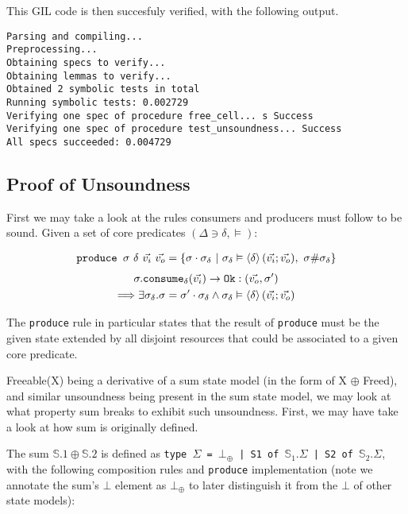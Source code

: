 \documentclass[,a4paper,oneside]{article}
\newcommand{\code}[1]{\texttt{#1}}
\newcommand{\mmdl}{\ensuremath{\mathbb S}}
\newcommand{\rarr}{\ensuremath{\rightarrow}}
\begin{document}
This GIL code is then succesfuly verified, with the following output.

\begin{verbatim}
Parsing and compiling...
Preprocessing...
Obtaining specs to verify...
Obtaining lemmas to verify...
Obtained 2 symbolic tests in total
Running symbolic tests: 0.002729
Verifying one spec of procedure free_cell... s Success
Verifying one spec of procedure test_unsoundness... Success
All specs succeeded: 0.004729	
\end{verbatim}


\subsection{Proof of Unsoundness}

First we may take a look at the rules consumers and producers must follow to be sound. Given a set of core predicates $(\Delta\ni\delta, \vDash)$:

\newcommand{\ins}[0]{\vec{v_i}}
\newcommand{\outs}[0]{\vec{v_o}}

\begin{gather*}
	\code{produce }\sigma ~\delta ~\ins~\outs = \{\sigma \cdot \sigma_\delta ~|~\sigma_\delta \vDash \corepred{$\delta$}{\ins}{\outs}, ~\sigma\#\sigma_\delta\}
\end{gather*}
\begin{gather*}
	\sigma.\code{consume}_\delta(\ins)\rarr \code{Ok}:(\outs,\sigma')\\
	\Longrightarrow\exists\sigma_\delta .\sigma=\sigma'\cdot \sigma_\delta\land \sigma_\delta\vDash\corepred{$\delta$}{\ins}{\outs}
\end{gather*}

The \code{produce} rule in particular states that the result of \code{produce} must be the given state extended by all disjoint resources that could be associated to a given core predicate.

Freeable(X) being a derivative of a sum state model (in the form of X $\oplus$ Freed), and similar unsoundness being present in the sum state model, we may look at what property sum breaks to exhibit such unsoundness. First, we may have take a look at how sum is originally defined.

The sum $\mmdl.1 \oplus \mmdl.2$ is defined as \code{type $\Sigma$ = $\bot_\oplus$ | S1 of $\mathbb S_1.\Sigma$ | S2 of $\mathbb S_2.\Sigma$}, with the following composition rules and \code{produce} implementation (note we annotate the sum's $\bot$ element as $\bot_\oplus$ to later distinguish it from the $\bot$ of other state models):
\end{document}
